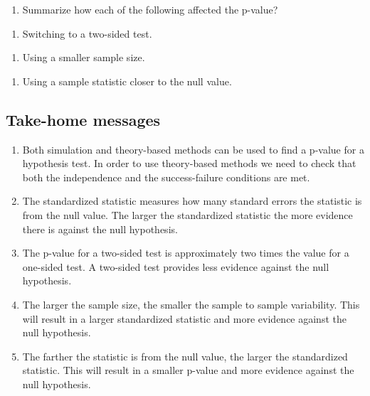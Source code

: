 \documentclass[
]{report}
\providecommand{\tightlist}{%
  \setlength{\itemsep}{0pt}\setlength{\parskip}{0pt}}
\begin{document}
\vspace{0.3in}

\begin{enumerate}
\def\labelenumi{\arabic{enumi}.}
\setcounter{enumi}{19}
\tightlist
\item
  Summarize how each of the following affected the p-value?
\end{enumerate}

\begin{enumerate}
\def\labelenumi{\alph{enumi})}
\tightlist
\item
  Switching to a two-sided test.
\end{enumerate}

\vspace{0.5in}

\begin{enumerate}
\def\labelenumi{\alph{enumi})}
\setcounter{enumi}{1}
\tightlist
\item
  Using a smaller sample size.
\end{enumerate}

\vspace{0.5in}

\begin{enumerate}
\def\labelenumi{\alph{enumi})}
\setcounter{enumi}{2}
\tightlist
\item
  Using a sample statistic closer to the null value.
\end{enumerate}

\vspace{0.5in}

\hypertarget{take-home-messages-11}{%
\subsection{Take-home messages}\label{take-home-messages-11}}

\begin{enumerate}
\def\labelenumi{\arabic{enumi}.}
\item
  Both simulation and theory-based methods can be used to find a p-value for a hypothesis test. In order to use theory-based methods we need to check that both the independence and the success-failure conditions are met.
\item
  The standardized statistic measures how many standard errors the statistic is from the null value. The larger the standardized statistic the more evidence there is against the null hypothesis.
\item
  The p-value for a two-sided test is approximately two times the value for a one-sided test. A two-sided test provides less evidence against the null hypothesis.
\item
  The larger the sample size, the smaller the sample to sample variability. This will result in a larger standardized statistic and more evidence against the null hypothesis.
\item
  The farther the statistic is from the null value, the larger the standardized statistic. This will result in a smaller p-value and more evidence against the null hypothesis.
\end{enumerate}
\end{document}
